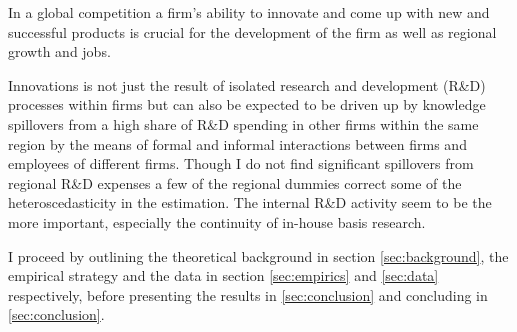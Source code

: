 \label{sec:intro}
In a global competition a firm's ability to innovate and come up with new and successful products is crucial for the development of the firm as well as regional growth and jobs.

Innovations is not just the result of isolated research and development (R\&D) processes within firms but can also be expected to be driven up by knowledge spillovers from a high share of R\&D spending in other firms within the same region by the means of formal and informal interactions between firms and employees of different firms. Though I do not find significant spillovers from regional R\&D expenses a few of the regional dummies correct some of the heteroscedasticity in the estimation. The internal R\&D activity seem to be the more important, especially the continuity of in-house basis research.

I proceed by outlining the theoretical background in section \ref{sec:background}, the empirical strategy and the data in section \ref{sec:empirics} and \ref{sec:data} respectively, before presenting the results in \ref{sec:conclusion} and concluding in \ref{sec:conclusion}.
